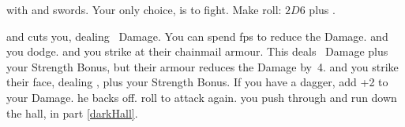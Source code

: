 with  and swords.
Your only choice, is to fight.
Make  roll: $2D6$ plus .

\begin{selectPath}
  {and  cuts you, dealing ~Damage.
  You can spend \glspl{fp} to reduce the Damage.}%
  {}
  {and you dodge.}%
  {}
  {and you strike at their chainmail armour.
  This deals ~Damage plus your Strength Bonus, but their armour reduces the Damage by~4.}%
  {}
  {and you strike their face, dealing , plus your Strength Bonus.  If you have a dagger, add +2 to your Damage.}%
  {}
  {he backs off.}%
  {}
  {roll to attack again.}%
  {}
  {you push through and run down the hall, in part \vref{darkHall}.}%
  {}
\end{selectPath}

